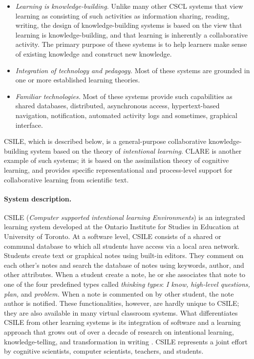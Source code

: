 \begin{itemize}
\item {\it Learning is knowledge-building.\/} Unlike many other CSCL
  systems that view learning as consisting of such activities as
  information sharing, reading, writing, the design of knowledge-building
  systems is based on the view that learning is knowledge-building, and
  that learning is inherently a collaborative activity. The primary
  purpose of these systems is to help learners make sense of existing
  knowledge and construct new knowledge.
  
\item {\it Integration of technology and pedagogy.\/} Most of these
  systems are grounded in one or more established learning theories.
  
\item {\it Familiar technologies.\/} Most of these systems provide such
  capabilities as shared databases, distributed, asynchronous access,
  hypertext-based navigation, notification, automated activity logs and
  sometimes, graphical interface.
\end{itemize}

CSILE, which is described below, is a general-purpose collaborative
knowledge-building system based on the theory of {\it intentional
learning\/}. CLARE is another example of such systems; it is based on the
assimilation theory of cognitive learning, and provides specific
representational and process-level support for collaborative learning from
scientific text.


\paragraph{System description.}

CSILE ({\it Computer supported intentional learning Environments\/}) is an
integrated learning system developed at the Ontario Institute for Studies
in Education at University of Toronto. At a software level, CSILE consists
of a shared or communal database to which all students have access via a
local area network. Students create text or graphical notes using built-in
editors. They comment on each other's notes and search the database of
notes using keywords, author, and other attributes. When a student create a
note, he or she associates that note to one of the four predefined types
called {\it thinking types\/}: {\it I know,\/} {\it high-level
questions,\/} {\it plan,\/} and {\it problem.\/} When a note is commented
on by other student, the note author is notified. These functionalities,
however, are hardly unique to CSILE; they are also available in many
virtual classroom systems. What differentiates CSILE from other learning
systems is its integration of software and a learning approach that grows
out of over a decade of research on intentional learning, knowledge-telling,
and transformation in writing \cite{Bereiter87}. CSILE represents a joint
effort by cognitive scientists, computer scientists, teachers, and
students.


